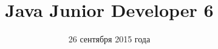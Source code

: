 \documentclass[mathserif,utf8,xcolor=table,14pt]{beamer}
\title{Java Junior Developer 6}
\institute{Санкт-Петербург}
\date[сентябрь 2015]{26 сентября 2015 года}
\begin{document}
\begin{frame}
\titlepage
\end{frame}



 
\end{document}
